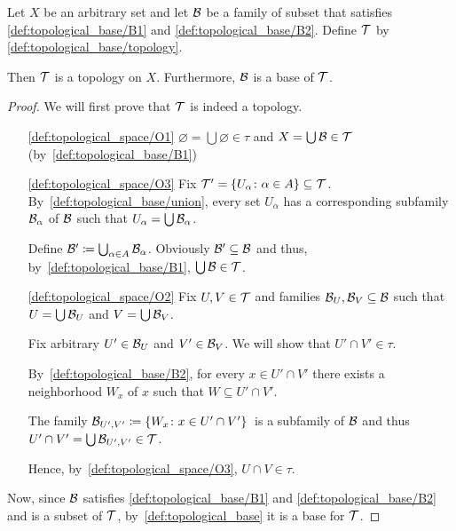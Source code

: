 \begin{proposition}
  Let $X$ be an arbitrary set and let $\mathcal B$ be a family of subset that satisfies \ref{def:topological_base/B1} and \ref{def:topological_base/B2}. Define $\mathcal T$ by \cref{def:topological_base/topology}.

  Then $\mathcal T$ is a topology on $X$. Furthermore, $\mathcal B$ is a base of $\mathcal T$.
\end{proposition}
\begin{proof}
  We will first prove that $\mathcal T$ is indeed a topology.

  \begin{enumerate}
    \item[\ref{def:topological_space/O1}] $\varnothing = \bigcup \varnothing \in \tau$ and $X = \bigcup \mathcal B \in \mathcal T$ (by~\ref{def:topological_base/B1})

    \item[\ref{def:topological_space/O3}] Fix $\mathcal T' = \{ U_\alpha \colon \alpha \in A \} \subseteq \mathcal T$. By~\cref{def:topological_base/union}, every set $U_\alpha$ has a corresponding subfamily $\mathcal B_\alpha$ of $\mathcal B$ such that $U_\alpha = \bigcup \mathcal B_\alpha$.

    Define $\mathcal B' \coloneqq \bigcup_{\alpha \in A} \mathcal B_\alpha$. Obviously $\mathcal B' \subseteq \mathcal B$ and thus, by~\ref{def:topological_base/B1}, $\bigcup \mathcal B \in \mathcal T$.

    \item[\ref{def:topological_space/O2}] Fix $U, V \in \mathcal T$ and families $\mathcal B_U, \mathcal B_V \subseteq \mathcal B$ such that $U = \bigcup \mathcal B_U$ and $V = \bigcup \mathcal B_V$.

    Fix arbitrary $U' \in \mathcal B_U$ and $V' \in \mathcal B_V$. We will show that $U' \cap V' \in \tau$.

    By~\ref{def:topological_base/B2}, for every $x \in U' \cap V'$ there exists a neighborhood $W_x$ of $x$ such that $W \subseteq U' \cap V'$.

    The family $\mathcal B_{U',V'} \coloneqq \{ W_x \colon x \in U' \cap V' \}$~\AOC is a subfamily of $\mathcal B$ and thus $U' \cap V' = \bigcup \mathcal B_{U',V'} \in \mathcal T$.

    Hence, by~\ref{def:topological_space/O3}, $U \cap V \in \tau$.
  \end{enumerate}

  Now, since $\mathcal B$ satisfies \ref{def:topological_base/B1} and \ref{def:topological_base/B2} and is a subset of $\mathcal T$, by~\cref{def:topological_base} it is a base for $\mathcal T$.
\end{proof}

